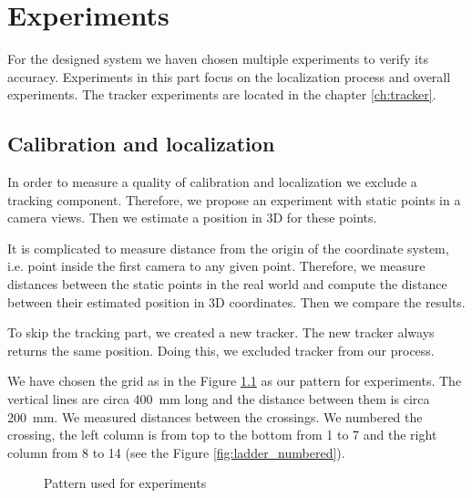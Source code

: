 \chapter{Experiments} 

For the designed system we haven chosen multiple experiments to
verify its accuracy. Experiments in this part focus on the localization process
and overall experiments. The tracker experiments are located in the chapter
\ref{ch:tracker}.

\section{Calibration and localization}
\label{s:experiment-static}

In order to measure a quality of calibration and localization we exclude a
tracking component. Therefore, we propose an experiment with static points in a
camera views. Then we estimate a position in 3D for these points.

It is complicated to measure distance from the origin of the coordinate system,
i.e. point inside the first camera to any given point. Therefore, we measure
distances between the static points in the real world and compute the distance
between their estimated position in 3D coordinates. Then we compare the results.

To skip the tracking part, we created a new tracker.  The new tracker always
returns the same position.  Doing this, we excluded tracker from our process.

We have chosen the grid as in the Figure \ref{fig:grid} as our pattern for experiments.
The vertical lines are circa 400~mm long and the distance between them is circa
200~mm. We measured distances between the crossings. We numbered the crossing,
the left column is from top to the bottom from 1 to 7 and the right column from
8 to 14 (see the Figure \ref{fig:ladder_numbered}).

\begin{figure}
\centering
{}
\caption{Pattern used for experiments}
\label{fig:grid}
\end{figure}

